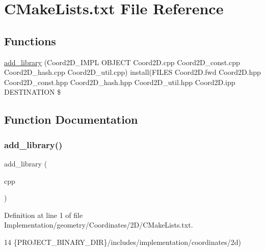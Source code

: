 \hypertarget{Implementation_2geometry_2Coordinates_22D_2CMakeLists_8txt}{}\section{C\+Make\+Lists.\+txt File Reference}
\label{Implementation_2geometry_2Coordinates_22D_2CMakeLists_8txt}
\subsection*{Functions}
\begin{DoxyCompactItemize}
\item 
\hyperlink{Implementation_2geometry_2Coordinates_22D_2CMakeLists_8txt_ab6d16e6c73bfafdd8597a0cc6dc51844}{add\+\_\+library} (Coord2\+D\+\_\+\+I\+M\+PL O\+B\+J\+E\+CT Coord2\+D.\+cpp Coord2\+D\+\_\+const.\+cpp Coord2\+D\+\_\+hash.\+cpp Coord2\+D\+\_\+util.\+cpp) install(F\+I\+L\+ES Coord2\+D.\+fwd Coord2\+D.\+hpp Coord2\+D\+\_\+const.\+hpp Coord2\+D\+\_\+hash.\+hpp Coord2\+D\+\_\+util.\+hpp Coord2\+D.\+ipp D\+E\+S\+T\+I\+N\+A\+T\+I\+ON \$
\end{DoxyCompactItemize}


\subsection{Function Documentation}
\mbox{\label{Implementation_2geometry_2Coordinates_22D_2CMakeLists_8txt_ab6d16e6c73bfafdd8597a0cc6dc51844}} 
\subsubsection{\texorpdfstring{add\+\_\+library()}{add\_library()}}
{\footnotesize\ttfamily add\+\_\+library (\begin{DoxyParamCaption}\item[{Coord2\+D\+\_\+\+I\+M\+PL O\+B\+J\+E\+CT Coord2\+D.\+cpp Coord2\+D\+\_\+const.\+cpp Coord2\+D\+\_\+hash.\+cpp Coord2\+D\+\_\+util.}]{cpp }\end{DoxyParamCaption})}



Definition at line 1 of file Implementation/geometry/\+Coordinates/2\+D/\+C\+Make\+Lists.\+txt.


\begin{DoxyCode}
14                \{PROJECT\_BINARY\_DIR\}/includes/implementation/coordinates/2d)
\end{DoxyCode}
